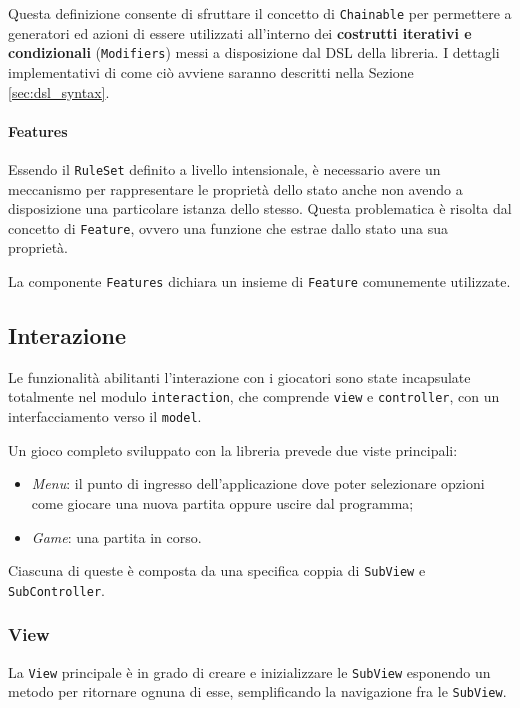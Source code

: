 Questa definizione consente di sfruttare il concetto di \texttt{Chainable} per permettere a generatori ed azioni di essere utilizzati all'interno dei \textbf{costrutti iterativi e condizionali} (\texttt{Modifiers}) messi a disposizione dal DSL della libreria.
%
I dettagli implementativi di come ciò avviene saranno descritti nella Sezione \ref{sec:dsl_syntax}.

\paragraph{Features}
Essendo il \texttt{RuleSet} definito a livello intensionale, è necessario avere un meccanismo per rappresentare le proprietà dello stato anche non avendo a disposizione una particolare istanza dello stesso.
%
Questa problematica è risolta dal concetto di \texttt{Feature}, ovvero una funzione che estrae dallo stato una sua proprietà.

La componente \texttt{Features} dichiara un insieme di \texttt{Feature} comunemente utilizzate.


\subsection{Interazione}

Le funzionalità abilitanti l'interazione con i giocatori sono state incapsulate totalmente nel modulo \texttt{interaction}, che comprende \texttt{view} e \texttt{controller}, con un interfacciamento verso il \texttt{model}.

Un gioco completo sviluppato con la libreria prevede due viste principali:
\begin{itemize}
    \item \textit{Menu}: il punto di ingresso dell'applicazione dove poter selezionare opzioni come giocare una nuova partita oppure uscire dal programma;
    \item \textit{Game}: una partita in corso.
\end{itemize}
%
Ciascuna di queste è composta da una specifica coppia di \texttt{SubView} e \texttt{SubController}.

\subsubsection{View}

La \texttt{View} principale è in grado di creare e inizializzare le \texttt{SubView} esponendo un metodo per ritornare ognuna di esse, semplificando la navigazione fra le \texttt{SubView}.

